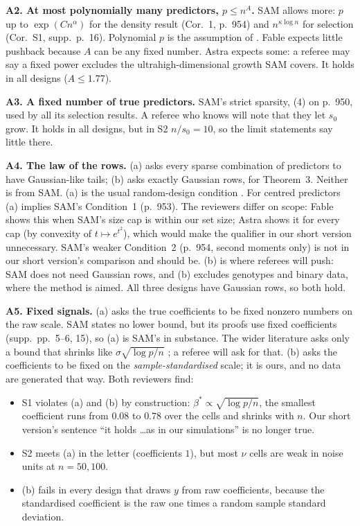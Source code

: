 \documentclass[11pt]{article}
\newcommand{\sz}{s_0}
\begin{document}
\textbf{A2. At most polynomially many predictors, $p\le n^A$.} SAM allows more: $p$ up to $\exp(Cn^\alpha)$ for the
density result (Cor.~1, p.~954) and $n^{\kappa\log n}$ for selection (Cor.~S1, supp.~p.~16). Polynomial $p$ is the
assumption of \citet{BuhlmannKalischMaathuis2010}. Fable expects little pushback because $A$ can be any fixed number.
Astra expects some: a referee may say a fixed power excludes the ultrahigh-dimensional growth SAM covers. It holds in all
designs ($A\le1.77$).

\textbf{A3. A fixed number of true predictors.} SAM's strict sparsity, (4) on p.~950, used by all its selection
results. A referee who knows \citet{YangWainwrightJordan2016} will note that they let $\sz$ grow. It holds in all
designs, but in S2 $n/\sz=10$, so the limit statements say little there.

\textbf{A4. The law of the rows.} (a) asks every sparse combination of predictors to have Gaussian-like tails; (b) asks
exactly Gaussian rows, for Theorem~3. Neither is from SAM. (a) is the usual random-design condition
\citep[e.g.][]{NarisettyHe2014}. For centred predictors (a) implies SAM's Condition~1 (p.~953). The reviewers differ on
scope: Fable shows this when SAM's size cap is within our set size; Astra shows it for every cap (by convexity of
$t\mapsto e^{t^2}$), which would make the qualifier in our short version unnecessary. SAM's weaker Condition~2 (p.~954,
second moments only) is not in our short version's comparison and should be. (b) is where referees will push: SAM does
not need Gaussian rows, and (b) excludes genotypes and binary data, where the method is aimed. All three designs have
Gaussian rows, so both hold.

\textbf{A5. Fixed signals.} (a) asks the true coefficients to be fixed nonzero numbers on the raw scale. SAM states no
lower bound, but its proofs use fixed coefficients (supp.~pp.~5--6, 15), so (a) is SAM's in substance. The wider
literature asks only a bound that shrinks like $\sigma\sqrt{\log p/n}$ \citep[Cond.~3 of][]{FanLv2008}; a referee will
ask for that. (b) asks the coefficients to be fixed on the \emph{sample-standardised} scale; it is ours, and no data are
generated that way. Both reviewers find:
\begin{itemize}
  \item S1 violates (a) and (b) by construction: $\beta^*\propto\sqrt{\log p/n}$, the smallest coefficient runs from
    $0.08$ to $0.78$ over the cells and shrinks with $n$. Our short version's sentence ``it holds \dots as in our
    simulations'' is no longer true.
  \item S2 meets (a) in the letter (coefficients $1$), but most $\nu$ cells are weak in noise units at $n=50,100$.
  \item (b) fails in every design that draws $y$ from raw coefficients, because the standardised coefficient is the raw
    one times a random sample standard deviation.
\end{itemize}
\end{document}
